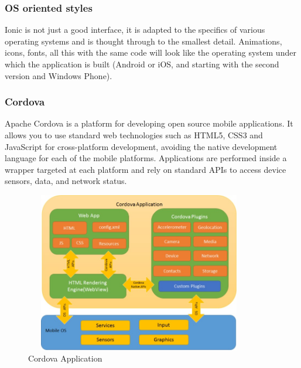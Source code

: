 \subsubsection{OS oriented styles}
Ionic is not just a good interface, it is adapted to the specifics of various operating systems and is thought through to the smallest detail. Animations, icons, fonts, all this with the same code will look like the operating system under which the application is built (Android or iOS, and starting with the second version and Windows Phone).\cite{IonicOS}

\subsubsection{Cordova}
Apache Cordova is a platform for developing open source mobile applications. It allows you to use standard web technologies such as HTML5, CSS3 and JavaScript for cross-platform development, avoiding the native development language for each of the mobile platforms. Applications are performed inside a wrapper targeted at each platform and rely on standard APIs to access device sensors, data, and network status. \cite{Cordova}

\begin{figure}[h]
\centering
\includegraphics[width=10cm, height=7cm]{img/Cordova.jpg}
\caption{Cordova Application}
\end{figure}

